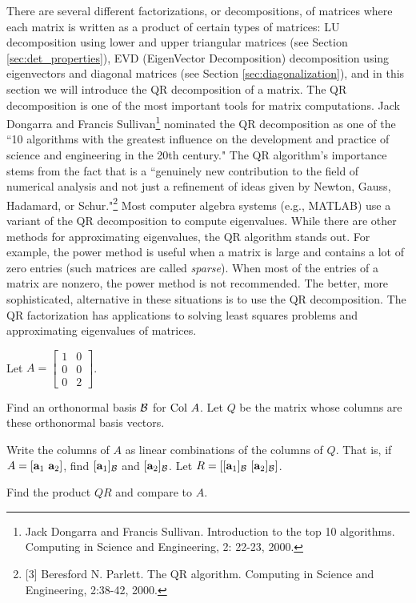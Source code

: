 
There are several different factorizations, or decompositions, of matrices where each matrix is written as a product of certain types of matrices: LU decomposition using lower and upper triangular matrices (see Section \ref{sec:det_properties}), EVD (EigenVector Decomposition) decomposition using eigenvectors and diagonal matrices (see Section \ref{sec:diagonalization}), and in this section we will introduce the QR decomposition of a matrix. The QR decomposition is one of the most important tools for matrix computations. Jack Dongarra and Francis Sullivan\footnote{Jack Dongarra and Francis Sullivan. Introduction to the top 10 algorithms. Computing in Science and Engineering, 2: 22-23, 2000.} nominated the QR decomposition as one of the ``10 algorithms with the greatest influence on the development and practice of science and engineering in the 20th century."  The QR algorithm's importance stems from the fact that is a ``genuinely new contribution to the field of numerical analysis and not just a refinement of ideas given by Newton, Gauss, Hadamard, or Schur."\footnote{[3] Beresford N. Parlett. The QR algorithm. Computing in Science and Engineering, 2:38-42, 2000.}  Most computer algebra systems (e.g., MATLAB) use a variant of the QR decomposition to compute eigenvalues. While there are other methods for approximating eigenvalues, the QR algorithm stands out. For example, the power method is useful when a matrix is large and contains a lot of zero entries (such matrices are called \emph{sparse}). When most of the entries of a matrix are nonzero, the power method is not recommended. The better, more sophisticated,  alternative in these situations is to use the QR decomposition. The QR factorization has applications to solving least squares problems and approximating eigenvalues of matrices.

\begin{activity} \label{act:6_e_QR} Let $A = \left[ \begin{array}{cc} 1&0 \\ 0&0 \\ 0&2 \end{array} \right]$.
	\ba
	\item Find an orthonormal basis $\mathcal{B}$ for $\text{Col } A$.  Let $Q$ be the matrix whose columns are these orthonormal basis vectors. 
		
	\item Write the columns of $A$ as linear combinations of the columns of $Q$. That is, if $A = [\mathbf{a}_1 \ \mathbf{a}_2]$, find $[\mathbf{a}_1]_{\mathcal{B}}$ and $[\mathbf{a}_2]_{\mathcal{B}}$. Let $R = [[\mathbf{a}_1]_{\mathcal{B}} \ [\mathbf{a}_2]_{\mathcal{B}}]$. 
	
	\item Find the product $QR$ and compare to $A$. 
	
	\ea
		
\end{activity}

